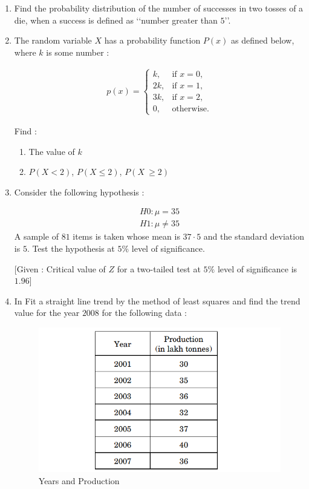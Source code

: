 \begin{enumerate}[label=\thesection.\arabic*.,ref=\thesection.\theenumi]
\item Find the probability distribution of the number of successes in two tosses 
of a die, when a success is defined as ‘‘number greater than $5$’’.

\item The random variable $X$ has a probability function $P(x)$ as defined below, 
where $k$ is some number :

\begin{align}
    p(x) = \begin{cases}
        k, & \text{if } x = 0, \\
        2k, & \text{if } x = 1, \\
        3k, & \text{if } x = 2, \\
        0, & \text{otherwise.}
    \end{cases}
\end{align}

Find :
\begin{enumerate}[label=(\roman*)]
 \item The value of $k$
 
 \item $P(X < 2)$, $P(X \leq 2)$, $P(X\ \geq 2)$
 
 \end{enumerate}

\item Consider the following hypothesis :

\begin {align}
H0 : \mu =  35\\
H1 : \mu \neq 35
\end{align}
A sample of $81$ items is taken whose mean is $37·5$ and the standard deviation is $5$. Test the hypothesis at $5\%$ level of significance.

[Given : Critical value of $Z$ for a two-tailed test at $5\%$ level of significance is $1.96$]

\item In  Fit a straight line trend by the method of least squares and find the trend 
value for the year $2008$ for the following data :

\begin{figure}[H]
        \centering
        \includegraphics[width=\columnwidth]{./figs/Screenshot (37).png}
        \caption{Years and Production}
        \label{fig:2022/probability/fig6.png}
    \end{figure}
\end{enumerate}

